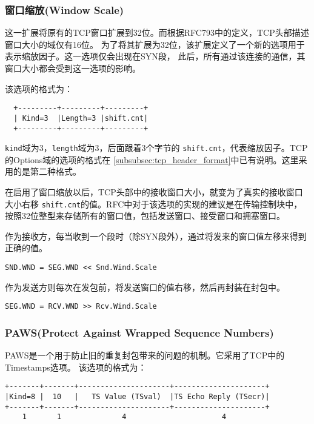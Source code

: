 \subsubsection{窗口缩放(Window Scale)}
\label{subsubsec:window_scale}
这一扩展将原有的TCP窗口扩展到32位。而根据RFC793中的定义，TCP头部描述窗口大小的域仅有16位。
为了将其扩展为32位，该扩展定义了一个新的选项用于表示缩放因子。这一选项仅会出现在SYN段，
此后，所有通过该连接的通信，其窗口大小都会受到这一选项的影响。

该选项的格式为：
\begin{verbatim}
  +---------+---------+---------+ 
  | Kind=3  |Length=3 |shift.cnt| 
  +---------+---------+---------+
\end{verbatim}

\texttt{kind}域为3，\texttt{length}域为3，后面跟着3个字节的
\texttt{shift.cnt}，代表缩放因子。TCP的Options域的选项的格式在
\ref{subsubsec:tcp_header_format}中已有说明。这里采用的是第二种格式。

在启用了窗口缩放以后，TCP头部中的接收窗口大小，就变为了真实的接收窗口大小右移
\texttt{shift.cnt}的值。RFC中对于该选项的实现的建议是在传输控制块中，
按照32位整型来存储所有的窗口值，包括发送窗口、接受窗口和拥塞窗口。

作为接收方，每当收到一个段时（除SYN段外），通过将发来的窗口值左移来得到正确的值。
\begin{verbatim}
SND.WND = SEG.WND << Snd.Wind.Scale
\end{verbatim}

作为发送方则每次在发包前，将发送窗口的值右移，然后再封装在封包中。
\begin{verbatim}
SEG.WND = RCV.WND >> Rcv.Wind.Scale
\end{verbatim}

		\subsubsection{PAWS(Protect Against Wrapped Sequence Numbers)}
			PAWS是一个用于防止旧的重复封包带来的问题的机制。它采用了TCP中的Timestamps选项。
			该选项的格式为：
\begin{verbatim}
+-------+-------+---------------------+---------------------+ 
|Kind=8 |  10   |   TS Value (TSval)  |TS Echo Reply (TSecr)| 
+-------+-------+---------------------+---------------------+
    1       1              4                      4
\end{verbatim}

